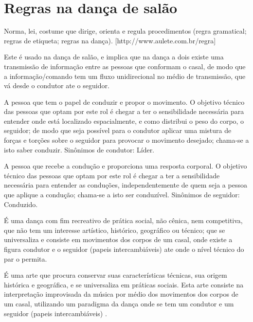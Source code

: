 
\chapter{Regras na dança de salão}

\begin{definition}[Regra:]
Norma, lei, costume que dirige, orienta e regula procedimentos (regra gramatical; regras de etiqueta; regras na dança).
[http://www.aulete.com.br/regra]
\end{definition}
\begin{definition} Este é usado na dança de salão, 
e implica que na dança a dois existe uma transmissão de informação
entre as pessoas que conformam o casal, 
de modo que a informação/comando tem um fluxo unidirecional no médio de transmissão,
que vá desde o condutor ate o seguidor. 
\end{definition}
\begin{definition} 
A pessoa que tem o papel de conduzir e propor o movimento. 
O objetivo técnico das pessoas que optam por este rol é chegar 
a ter o sensibilidade necessária para entender onde está localizado espacialmente, 
e como distribui o peso do corpo, o seguidor; 
de modo que seja possível para o condutor aplicar uma mistura de forças e torções sobre o seguidor para provocar o movimento desejado;
chama-se a isto saber conduzir.
Sinônimos de condutor: Líder.
\end{definition}
\begin{definition} 
A pessoa que recebe a condução e proporciona uma resposta corporal. 
O objetivo técnico das pessoas que optam por este rol é chegar 
a ter a sensibilidade necessária para entender as conduções,
independentemente de quem seja a pessoa que aplique a condução;
chama-se a isto ser conduzível.
Sinônimos de seguidor: Conduzido.
\end{definition}
\begin{definition}
É uma dança com fim recreativo de prática social, não cênica, nem competitiva, 
que não tem um interesse artístico, histórico, geográfico ou técnico; 
que se universaliza e consiste em movimentos dos corpos de um casal, 
onde existe a figura condutor e o seguidor (papeis intercambiáveis) \cite{Zamoner2012} ate onde o nível técnico do par o permita.
\end{definition}
\begin{definition}
É uma arte que procura conservar suas características técnicas, 
sua origem histórica e geográfica, e se universaliza em práticas sociais. 
Esta arte consiste na interpretação improvisada da música por médio dos movimentos 
dos corpos de um casal, utilizando um paradigma da dança onde se tem um condutor e um seguidor (papeis intercambiáveis) \cite{Zamoner2012}.
\end{definition}

